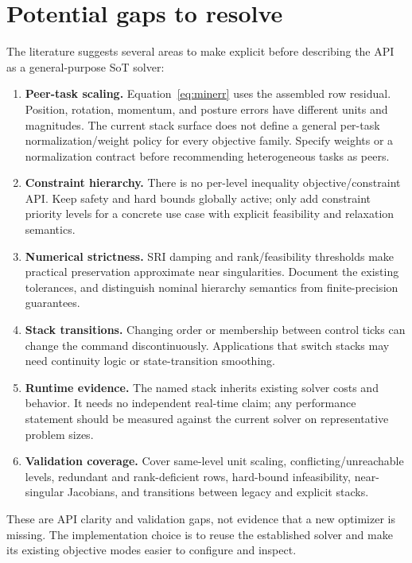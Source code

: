 \documentclass[11pt]{article}
\begin{document}
\section{Potential gaps to resolve}

The literature suggests several areas to make explicit before describing the
API as a general-purpose SoT solver:
\begin{enumerate}[leftmargin=*,nosep]
  \item \textbf{Peer-task scaling.} Equation~\eqref{eq:minerr} uses the
        assembled row residual. Position, rotation, momentum, and posture
        errors have different units and magnitudes. The current stack surface
        does not define a general per-task normalization/weight policy for
        every objective family. Specify weights or a normalization contract
        before recommending heterogeneous tasks as peers.
  \item \textbf{Constraint hierarchy.} There is no per-level inequality
        objective/constraint API. Keep safety and hard bounds globally active;
        only add constraint priority levels for a concrete use case with
        explicit feasibility and relaxation semantics.
  \item \textbf{Numerical strictness.} SRI damping and rank/feasibility
        thresholds make practical preservation approximate near singularities.
        Document the existing tolerances, and distinguish nominal hierarchy
        semantics from finite-precision guarantees.
  \item \textbf{Stack transitions.} Changing order or membership between
        control ticks can change the command discontinuously. Applications
        that switch stacks may need continuity logic or state-transition
        smoothing.
  \item \textbf{Runtime evidence.} The named stack inherits existing solver
        costs and behavior. It needs no independent real-time claim; any
        performance statement should be measured against the current solver
        on representative problem sizes.
  \item \textbf{Validation coverage.} Cover same-level unit scaling,
        conflicting/unreachable levels, redundant and rank-deficient rows,
        hard-bound infeasibility, near-singular Jacobians, and transitions
        between legacy and explicit stacks.
\end{enumerate}

These are API clarity and validation gaps, not evidence that a new optimizer
is missing. The implementation choice is to reuse the established solver and
make its existing objective modes easier to configure and inspect.
\end{document}
